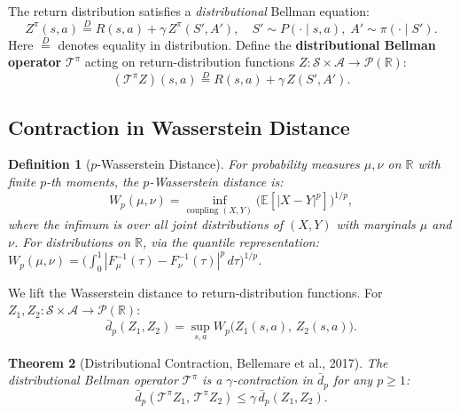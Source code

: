 \documentclass[11pt,a4paper]{article}
\newtheorem{theorem}{Theorem}[section]
\newtheorem{definition}[theorem]{Definition}
\newcommand{\E}{\mathbb{E}}
\newcommand{\R}{\mathbb{R}}
\newcommand{\cS}{\mathcal{S}}
\newcommand{\cA}{\mathcal{A}}
\newcommand{\cP}{\mathcal{P}}
\newcommand{\cT}{\mathcal{T}}
\begin{document}
The return distribution satisfies a \emph{distributional} Bellman equation:
\[
  Z^\pi(s, a) \stackrel{D}{=} R(s, a) + \gamma\, Z^\pi(S', A'),
  \quad S' \sim P(\cdot \mid s, a),\; A' \sim \pi(\cdot \mid S').
\]
Here $\stackrel{D}{=}$ denotes equality in distribution. Define the
\textbf{distributional Bellman operator} $\cT^\pi$ acting on return-distribution
functions $Z : \cS \times \cA \to \cP(\R)$:
\[
  (\cT^\pi Z)(s,a) \stackrel{D}{=} R(s,a) + \gamma\, Z(S', A').
\]

\subsection{Contraction in Wasserstein Distance}

\begin{definition}[$p$-Wasserstein Distance]
For probability measures $\mu, \nu$ on $\R$ with finite $p$-th moments, the
$p$-Wasserstein distance is:
\[
  W_p(\mu, \nu) = \inf_{\text{coupling } (X,Y)} \bigl(\E[|X - Y|^p]\bigr)^{1/p},
\]
where the infimum is over all joint distributions of $(X, Y)$ with marginals $\mu$ and $\nu$.
For distributions on $\R$, via the quantile representation:
$W_p(\mu, \nu) = \bigl(\int_0^1 |F_\mu^{-1}(\tau) - F_\nu^{-1}(\tau)|^p \, d\tau\bigr)^{1/p}$.
\end{definition}

We lift the Wasserstein distance to return-distribution functions. For $Z_1, Z_2 : \cS \times \cA \to \cP(\R)$:
\[
  \bar{d}_p(Z_1, Z_2) = \sup_{s, a} W_p\bigl(Z_1(s,a),\, Z_2(s,a)\bigr).
\]

\begin{theorem}[Distributional Contraction, Bellemare et al., 2017]
\label{thm:dist-contraction}
The distributional Bellman operator $\cT^\pi$ is a $\gamma$-contraction in
$\bar{d}_p$ for any $p \geq 1$:
\[
  \bar{d}_p(\cT^\pi Z_1,\, \cT^\pi Z_2) \leq \gamma\, \bar{d}_p(Z_1, Z_2).
\]
\end{theorem}
\end{document}
